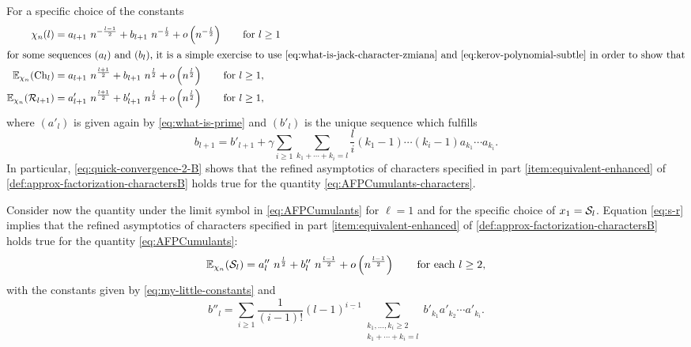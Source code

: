 \documentclass[12pt,usenames,dvipsnames,svgnames,table]{amsart}
\begin{document}
For a specific choice of the constants
\begin{align}
\label{eq:quick-convergence-1-B}
\chi_n(l)              &= a_{l+1}\ n^{-\frac{l-1}{2}} + b_{l+1} \ n^{-\frac{l}{2}} + o\left(  n^{-\frac{l}{2}} \right)
\qquad \text{for $l\geq 1$}\\
\intertext{for some sequences $(a_l)$ and $(b_l)$,
	it is a simple exercise to use \eqref{eq:what-is-jack-character-zmiana} and \eqref{eq:kerov-polynomial-subtle}
	in order to show that}
\label{eq:quick-convergence-2-B}
\E_{\chi_n}(\Ch_l)     &= a_{l+1}\ n^{ \frac{l+1}{2}} + b_{l+1}\ n^{\frac{l}{2}}+ o\left(  n^{ \frac{l}{2}} \right)
\qquad \text{for $l\geq 1$,}\\
\label{eq:quick-convergence-3-B}
\E_{\chi_n}(\Rfunct_{l+1})  &= a'_{l+1}\ n^{ \frac{l+1}{2}} + b'_{l+1} \ n^{\frac{l}{2}} + o\left(  n^{ \frac{l}{2}} \right)
\qquad \text{for $l\geq 1$,}
\end{align}
where $(a'_l)$ is given again by \eqref{eq:what-is-prime} and $(b'_l)$ is the unique sequence which fulfills
\begin{equation}
\label{eq:co-sie-dzieje-z-b}
b_{l+1}= b'_{l+1}+\gamma \sum_{i\geq 1} \sum_{k_1+\cdots+k_i=l}
\frac{l}{i} 
(k_1-1) \cdots (k_i-1) a_{k_1} \cdots a_{k_i}.
\end{equation}
In particular, \eqref{eq:quick-convergence-2-B} shows that the
refined asymptotics of characters specified in
part \ref{item:equivalent-enhanced} of \cref{def:approx-factorization-charactersB}
holds true for the quantity \eqref{eq:AFPCumulants-characters}.

\medskip

Consider now the quantity under the limit symbol in \eqref{eq:AFPCumulants}
for $\ell=1$ and for the specific choice of $x_1=\mathcal{S}_l$.
Equation \eqref{eq:s-r} implies that
the refined asymptotics of characters specified in
part \ref{item:equivalent-enhanced} of \cref{def:approx-factorization-charactersB}
holds true for the quantity \eqref{eq:AFPCumulants}:
\begin{equation}
\label{eq:quick-convergence-4-B}
\E_{\chi_n}(\Sfunct_{l})  = a''_{l}\ n^{ \frac{l}{2}} + b''_{l} \ n^{\frac{l-1}{2}} + o\left(  n^{ \frac{l-1}{2}} \right)
\qquad \text{for each $l\geq 2$,}
\end{equation}
with the constants given by \eqref{eq:my-little-constants} and
\begin{equation}
\label{eq:what-is-b-bis}
b''_l = \sum_{i\geq 1} \frac{1}{(i-1)!}  (l-1)^{\underline{i-1}} 
\sum_{\substack{k_1,\dots,k_i\geq 2 \\ k_1+\cdots+k_i=l }} b'_{k_1} a'_{k_2} \cdots a'_{k_i}.    
\end{equation}
\end{document}
